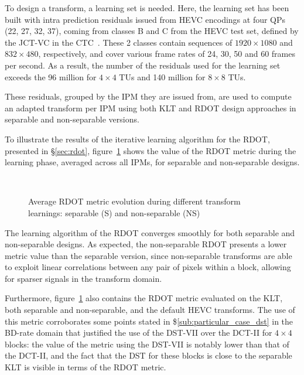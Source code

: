 \documentclass[11pt,a4paper,openright,twoside]{book}
\numberwithin{equation}{section} %
\numberwithin{figure}{section} %
\numberwithin{table}{section} %
\begin{document}
To design a transform, a learning set is needed.
Here, the learning set has been built with intra prediction residuals issued
from \ac{HEVC} encodings at four \acp{QP} (22, 27, 32, 37), coming from
classes B and C from the \ac{HEVC} test set, defined by the \ac{JCT-VC} in the
\ac{CTC}~\cite{bossen-12-common-test-conditions}.
These 2 classes contain sequences of $1920\times1080$ and $832\times480$,
respectively, and cover various frame rates of 24, 30, 50 and 60 frames per
second.
As a result, the number of the residuals used for the learning set exceeds the
96 million for $4\times4$ \acp{TU} and 140 million for $8\times8$ \acp{TU}.

These residuals, grouped by the \ac{IPM} they are issued from, are used to
compute an adapted transform per \ac{IPM} using both \ac{KLT} and \ac{RDOT}
design approaches in separable and non-separable versions.

To illustrate the results of the iterative learning algorithm for the
\ac{RDOT}, presented in \S\ref{sec:rdot},
figure~\ref{fig:rdot_metric_learning} shows the value of the \ac{RDOT} metric
during the learning phase, averaged across all \acp{IPM}, for separable and
non-separable designs.

\begin{figure}[tb]
	\centering
	\\	
	\caption[\acs{RDOT} metric during separable and non-separable transform
	learnings]
	{Average \acs{RDOT} metric evolution during different transform
	learnings: separable (S) and non-separable (NS)}
	\label{fig:rdot_metric_learning}
\end{figure}

The learning algorithm of the \ac{RDOT} converges smoothly for both separable
and non-separable designs.
As expected, the non-separable \ac{RDOT} presents a lower metric value than
the separable version, since non-separable transforms are able to exploit
linear correlations between any pair of pixels within a block, allowing for
sparser signals in the transform domain.

Furthermore, figure~\ref{fig:rdot_metric_learning} also contains the \ac{RDOT}
metric evaluated on the \ac{KLT}, both separable and non-separable, and the
default \ac{HEVC} transforms.
The use of this metric corroborates some points stated in
\$\ref{sub:particular_case_dst} in the \ac{BD}-rate domain that justified the
use of the \ac{DST}-VII over the \ac{DCT}-II for $4\times4$ blocks:
the value of the metric using the \ac{DST}-VII is notably lower than that of
the \ac{DCT}-II, and the fact that the \ac{DST} for these blocks is close to
the separable \ac{KLT} is visible in terms of the \ac{RDOT} metric.
\end{document}
